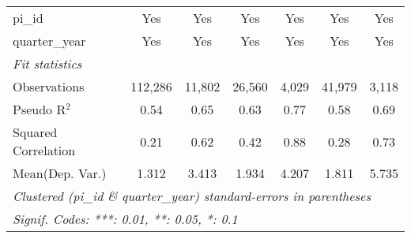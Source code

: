 \begin{tabular}{lcccccc}
   pi\_id                                                     & Yes           & Yes           & Yes            & Yes           & Yes           & Yes\\  
   quarter\_year                                              & Yes           & Yes           & Yes            & Yes           & Yes           & Yes\\  
   \midrule
   \emph{Fit statistics}\\
   Observations                                               & 112,286       & 11,802        & 26,560         & 4,029         & 41,979        & 3,118\\  
   Pseudo R$^2$                                               & 0.54          & 0.65          & 0.63           & 0.77          & 0.58          & 0.69\\  
   Squared Correlation                                        & 0.21          & 0.62          & 0.42           & 0.88          & 0.28          & 0.73\\  
Mean(Dep. Var.) & 1.312 & 3.413 & 1.934 & 4.207 & 1.811 & 5.735 \\
   \midrule \midrule
   \multicolumn{7}{l}{\emph{Clustered (pi\_id \& quarter\_year) standard-errors in parentheses}}\\
   \multicolumn{7}{l}{\emph{Signif. Codes: ***: 0.01, **: 0.05, *: 0.1}}\\
\end{tabular}
\par\endgroup
